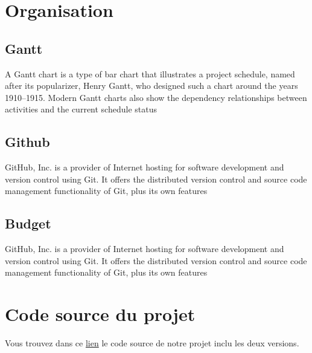 {\chapter{Organisation}\thispagestyle{fancy}
\section{Gantt}
A Gantt chart is a type of bar chart that illustrates a project schedule, named after its popularizer, Henry Gantt, who designed such a chart around the years 1910–1915. Modern Gantt charts also show the dependency relationships between activities and the current schedule status

\section{Github}
GitHub, Inc. is a provider of Internet hosting for software development and version control using Git. It offers the distributed version control and source code management functionality of Git, plus its own features

\section{Budget}
GitHub, Inc. is a provider of Internet hosting for software development and version control using Git. It offers the distributed version control and source code management functionality of Git, plus its own features



\pagebreak
{}
\chapter{Code source du projet}\thispagestyle{fancy}
Vous trouvez dans ce \href{https://github.com/mohammedAljadd/iEars}{lien} le code source de notre projet inclu les deux versions.\\

}

